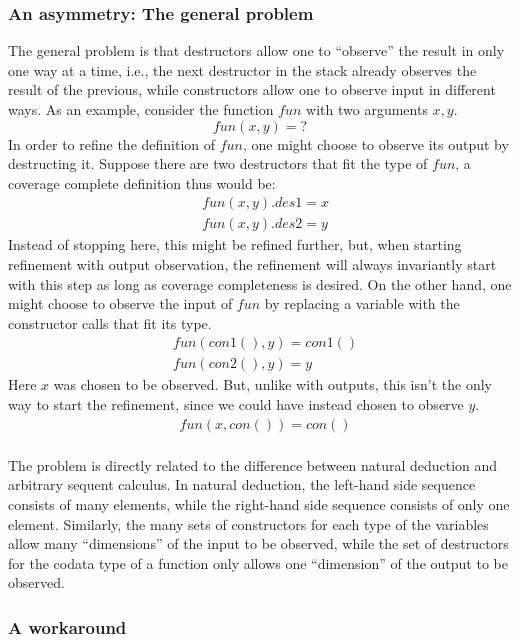 \subsubsection{An asymmetry: The general problem}

The general problem is that destructors allow one to ``observe'' the result in only one way at a time, i.e., the next destructor in the stack already observes the result of the previous, while constructors allow one to observe input in different ways. As an example, consider the function $fun$ with two arguments $x, y$.
\[
fun(x, y) = ?
\]
In order to refine the definition of $fun$, one might choose to observe its output by destructing it. Suppose there are two destructors that fit the type of $fun$, a coverage complete definition thus would be:
\begin{align*}
& fun(x, y).des1 = x \\
& fun(x, y).des2 = y
\end{align*}
Instead of stopping here, this might be refined further, but, when starting refinement with output observation, the refinement will always invariantly start with this step as long as coverage completeness is desired. On the other hand, one might choose to observe the input of $fun$ by replacing a variable with the constructor calls that fit its type.
\begin{align*}
& fun(con1(), y) = con1() \\
& fun(con2(), y) = y
\end{align*}
Here $x$ was chosen to be observed. But, unlike with outputs, this isn't the only way to start the refinement, since we could have instead chosen to observe $y$.
\begin{align*}
& fun(x, con()) = con() \\
\end{align*}

The problem is directly related to the difference between natural deduction and arbitrary sequent calculus. In natural deduction, the left-hand side sequence consists of many elements, while the right-hand side sequence consists of only one element. Similarly, the many sets of constructors for each type of the variables allow many ``dimensions'' of the input to be observed, while the set of destructors for the codata type of a function only allows one ``dimension'' of the output to be observed.

\subsubsection{A workaround}

